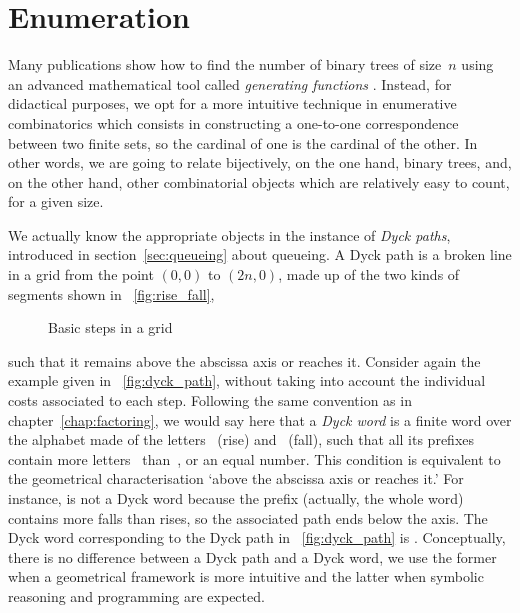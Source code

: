 \section{Enumeration}

Many publications \cite[\S~2.3.4.4]{Knuth_1997}
\cite[\S~5.1]{SedgewickFlajolet_1996} show how to find the number of
binary trees of size~\(n\) using an advanced mathematical tool called
\emph{generating functions} \cite[chap.~7]{GrahamKnuthPatashnik_1994}. Instead, for
didactical purposes, we opt for a more intuitive technique in
enumerative combinatorics which
consists in constructing a one\hyp{}to\hyp{}one correspondence between
two finite sets, so the cardinal of one is the cardinal of the
other. In other words, we are going to relate bijectively, on the one
hand, binary trees, and, on the other hand, other combinatorial
objects which are relatively easy to count, for a given size.

We actually know the appropriate objects in the instance of \emph{Dyck
  paths}, introduced in section~\ref{sec:queueing}
about queueing. A Dyck path is a broken line in a grid
from the point \((0,0)\) to \((2n,0)\), made up of the two kinds of
segments shown in \fig~\vref{fig:rise_fall},
\begin{figure}[b]
\centering
{}
\qquad
{}
\caption{Basic steps in a grid}
\label{fig:rise_fall}
\end{figure}
such that it remains above the abscissa axis or reaches it. Consider
again the example given in \fig~\vref{fig:dyck_path}, without taking
into account the individual costs associated to each step. Following
the same convention as in chapter~\ref{chap:factoring}, we would say
here that a \emph{Dyck word} is a
finite word over the alphabet made of the letters~
(rise) and~ (fall),
such that all its prefixes contain more
letters~ than~, or an equal number. This condition is
equivalent to the geometrical characterisation `above the abscissa
axis or reaches it.'  For instance,  is not a Dyck word
because the prefix  (actually, the whole word) contains more
falls than rises, so the associated path ends below the axis. The Dyck
word corresponding to the Dyck path in \fig~\vref{fig:dyck_path} is
. Conceptually, there is no difference between a
Dyck path and a Dyck word, we use the former when a geometrical
framework is more intuitive and the latter when symbolic reasoning and
programming are expected.

